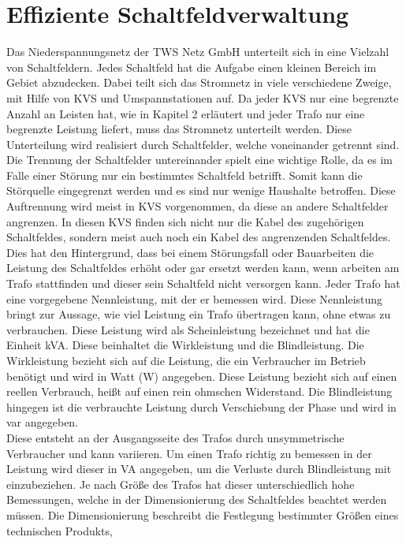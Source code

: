 \section{Effiziente Schaltfeldverwaltung}

Das Niederspannungsnetz der TWS Netz GmbH unterteilt sich in eine Vielzahl von Schaltfeldern. Jedes Schaltfeld hat die Aufgabe einen kleinen Bereich im Gebiet 
abzudecken. Dabei teilt sich das Stromnetz in viele verschiedene Zweige, mit Hilfe von KVS und Umspannstationen auf. Da jeder KVS nur eine begrenzte Anzahl an 
Leisten hat, wie in Kapitel 2 erläutert und jeder Trafo nur eine begrenzte Leistung liefert, muss das Stromnetz unterteilt werden. Diese Unterteilung wird 
realisiert durch Schaltfelder, welche voneinander getrennt sind. Die Trennung der Schaltfelder untereinander spielt eine wichtige Rolle, da es im Falle einer 
Störung nur ein bestimmtes Schaltfeld betrifft. Somit kann die Störquelle eingegrenzt werden und es sind nur wenige Haushalte betroffen. Diese Auftrennung 
wird meist in KVS vorgenommen, da diese an andere Schaltfelder angrenzen. In diesen KVS finden sich nicht nur die Kabel des zugehörigen Schaltfeldes, sondern 
meist auch noch ein Kabel des angrenzenden Schaltfeldes. Dies hat den Hintergrund, dass bei einem Störungsfall oder Bauarbeiten die Leistung des Schaltfeldes 
erhöht oder gar ersetzt werden kann, wenn \zB arbeiten am Trafo stattfinden und dieser sein Schaltfeld nicht versorgen kann. Jeder Trafo hat eine vorgegebene
Nennleistung, mit der er bemessen wird. Diese Nennleistung bringt zur Aussage, wie viel Leistung ein Trafo übertragen kann, ohne etwas zu verbrauchen. Diese 
Leistung wird als Scheinleistung bezeichnet und hat die Einheit kVA. Diese beinhaltet die Wirkleistung und die Blindleistung. Die Wirkleistung bezieht sich 
auf die Leistung, die ein Verbraucher im Betrieb benötigt und wird in Watt (W) angegeben. Diese Leistung bezieht sich auf einen reellen Verbrauch, heißt auf 
einen rein ohmschen Widerstand. Die Blindleistung hingegen ist die verbrauchte Leistung durch Verschiebung der Phase und wird in var angegeben. \autocite{Hufschmid.2021} 
\\
Diese entsteht an der Ausgangsseite des Trafos durch unsymmetrische Verbraucher und kann variieren. Um einen Trafo richtig zu bemessen in der Leistung wird 
dieser in VA angegeben, um die Verluste durch Blindleistung mit einzubeziehen. Je nach Größe des Trafos hat dieser unterschiedlich hohe Bemessungen, welche 
in der Dimensionierung des Schaltfeldes beachtet werden müssen. Die Dimensionierung beschreibt die Festlegung bestimmter Größen eines technischen Produkts, 
